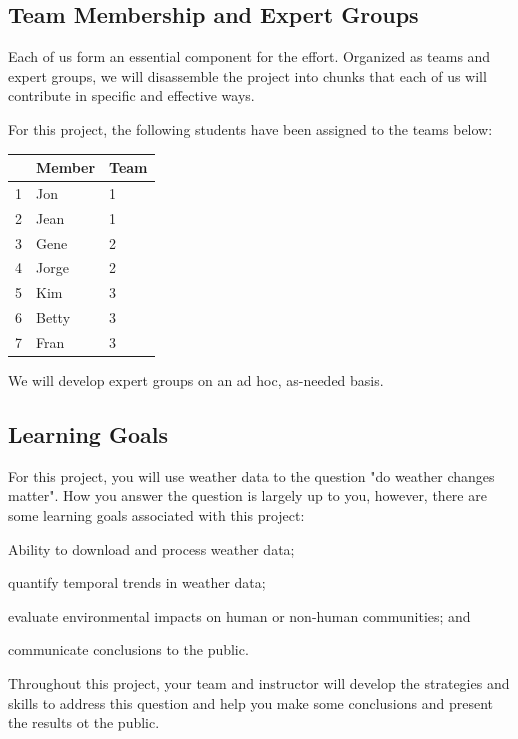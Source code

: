 \documentclass{article}\usepackage[]{graphicx}\usepackage[]{color}
\newenvironment{itemize*}%
  {\begin{itemize}%
    \setlength{\itemsep}{0pt}%
    \setlength{\parskip}{0pt}}%
  {\end{itemize}}
\begin{document}
\subsection{Team Membership and Expert Groups}

Each of us form an essential component for the effort. Organized as teams and expert groups, we will disassemble the project into chunks that each of us will contribute in specific and effective ways.

For this project, the following students have been assigned to the teams below:

\begin{table}[ht]
\centering
\begin{tabular}{rll}
  \hline
 & Member & Team \\ 
  \hline
1 & Jon & 1 \\ 
  2 & Jean & 1 \\ 
  3 & Gene & 2 \\ 
  4 & Jorge & 2 \\ 
  5 & Kim & 3 \\ 
  6 & Betty & 3 \\ 
  7 & Fran & 3 \\ 
   \hline
\end{tabular}
\end{table}


We will develop expert groups on an ad hoc, as-needed basis.

\subsection{Learning Goals}

For this project, you will use weather data to the question "do weather changes matter". How you answer the question is largely up to you, however, there are some learning goals associated with this project:

\begin{itemize*}
  \item Ability to download and process weather data;
  \item quantify temporal trends in weather data;
  \item evaluate environmental impacts on human or non-human communities; and
  \item communicate conclusions to the public.
\end{itemize*}

Throughout this project, your team and instructor will develop the strategies and skills to address this question and help you make some conclusions and present the results ot the public.
\end{document}
